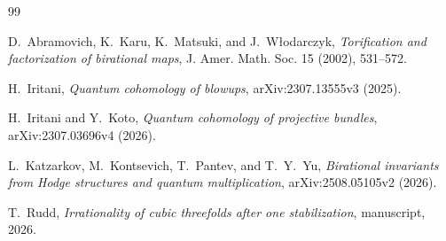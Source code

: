 \documentclass[11pt]{article}
\numberwithin{equation}{section}
\theoremstyle{definition}
\theoremstyle{remark}
\begin{document}
\begin{thebibliography}{99}

D.~Abramovich, K.~Karu, K.~Matsuki, and J.~W{\l}odarczyk,
\emph{Torification and factorization of birational maps},
J. Amer. Math. Soc. 15 (2002), 531--572.

H.~Iritani,
\emph{Quantum cohomology of blowups},
arXiv:2307.13555v3 (2025).

H.~Iritani and Y.~Koto,
\emph{Quantum cohomology of projective bundles},
arXiv:2307.03696v4 (2026).

L.~Katzarkov, M.~Kontsevich, T.~Pantev, and T.~Y.~Yu,
\emph{Birational invariants from Hodge structures and quantum
multiplication},
arXiv:2508.05105v2 (2026).

T.~Rudd,
\emph{Irrationality of cubic threefolds after one stabilization},
manuscript, 2026.

\end{thebibliography}
\end{document}
